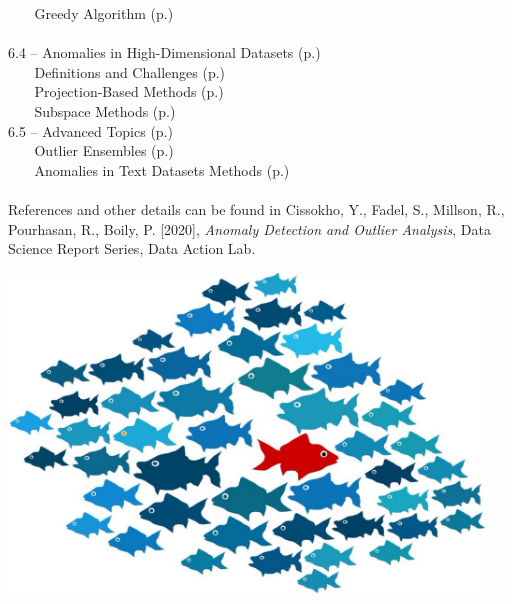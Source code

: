 \documentclass[20pt,landscape,footrule,headrule]{foils}
\newcommand{\localtextbulletone}{{\raisebox{.45ex}{\rule{.6ex}{.6ex}}}}
\begin{document}
\textcolor{white}{ab} \localtextbulletone\ Greedy Algorithm (p.\@\pageref{6.3.2}) 
\normalsize \ \\ \ \\ 
6.4 -- Anomalies in High-Dimensional Datasets (p.\pageref{6.4}) \\ 
\small
\textcolor{white}{ab} \localtextbulletone\ Definitions and Challenges (p.\@\pageref{6.4.1}) \\ 
\textcolor{white}{ab} \localtextbulletone\ Projection-Based Methods (p.\@\pageref{6.4.2}) \\ 
\textcolor{white}{ab} \localtextbulletone\ Subspace  Methods (p.\@\pageref{6.4.3}) 
\normalsize
\newpage\ \\ \noindent 
6.5 -- Advanced Topics (p.\pageref{6.5}) \\ 
\small
\textcolor{white}{ab} \localtextbulletone\ Outlier Ensembles (p.\@\pageref{6.5.1}) \\ 
\textcolor{white}{ab} \localtextbulletone\ Anomalies in Text Datasets Methods (p.\@\pageref{6.5.2})\normalsize 
 \ \\ \ \\ 
References and other details can be found in Cissokho, Y., Fadel, S., Millson, R., Pourhasan, R., Boily, P. [2020], \textit{Anomaly Detection and Outlier Analysis}, Data Science Report Series, Data Action Lab.


\newpage
\begin{center}
\includegraphics[width=0.95\textwidth]{Images/fish.png}
\end{center}
\end{document}
